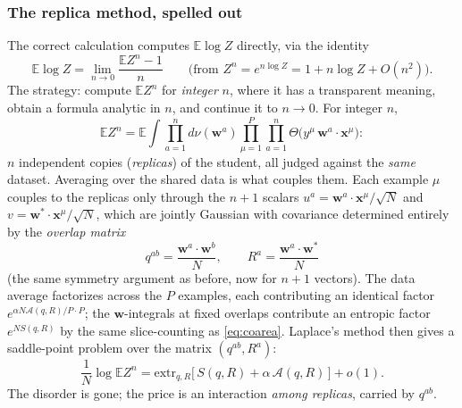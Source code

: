 \documentclass[11pt]{article}
\newcommand{\E}{\mathbb{E}}
\newcommand{\bv}[1]{\boldsymbol{#1}}
\begin{document}
\subsubsection{The replica method, spelled out}
\label{sec:replica-method}

The correct calculation computes $\E \log Z$ directly, via the identity
\begin{equation}
  \label{eq:replica-identity}
  \E \log Z = \lim_{n\to0} \frac{\E Z^n - 1}{n}
  \qquad\text{(from } Z^n = e^{n\log Z} = 1 + n\log Z + O(n^2)\text{)}.
\end{equation}
The strategy: compute $\E Z^n$ for \emph{integer} $n$, where it has a
transparent meaning, obtain a formula analytic in $n$, and continue it to
$n \to 0$. For integer $n$,
\begin{equation}
  \label{eq:EZn}
  \E Z^n = \E \int \prod_{a=1}^{n} d\nu(\bv{w}^a)
  \prod_{\mu=1}^{P} \prod_{a=1}^{n}
  \Theta\bigl(y^\mu\, \bv{w}^a \cdot \bv{x}^\mu\bigr):
\end{equation}
$n$ independent copies (\emph{replicas}) of the student, all judged against
the \emph{same} dataset. Averaging over the shared data is what couples
them. Each example $\mu$ couples to the replicas only through the $n + 1$
scalars $u^a = \bv{w}^a\cdot\bv{x}^\mu/\sqrt N$ and $v =
\bv{w}^*\cdot\bv{x}^\mu/\sqrt N$, which are jointly Gaussian with
covariance determined entirely by the \emph{overlap matrix}
\begin{equation}
  \label{eq:overlap-matrix}
  q^{ab} = \frac{\bv{w}^a \cdot \bv{w}^b}{N},
  \qquad
  R^a = \frac{\bv{w}^a \cdot \bv{w}^*}{N}
\end{equation}
(the same symmetry argument as before, now for $n+1$ vectors). The data
average factorizes across the $P$ examples, each contributing an identical
factor $e^{\alpha N \mathcal{A}(q, R) / P \cdot P}$; the $\bv{w}$-integrals
at fixed overlaps contribute an entropic factor $e^{N S(q, R)}$ by the same
slice-counting as \cref{eq:coarea}. Laplace's method then gives a
saddle-point problem over the matrix $(q^{ab}, R^a)$:
\begin{equation}
  \label{eq:replica-saddle}
  \frac1N \log \E Z^n = \mathrm{extr}_{q, R}
  \bigl[\, S(q, R) + \alpha\, \mathcal{A}(q, R) \,\bigr] + o(1).
\end{equation}
The disorder is gone; the price is an interaction \emph{among replicas},
carried by $q^{ab}$.
\end{document}
